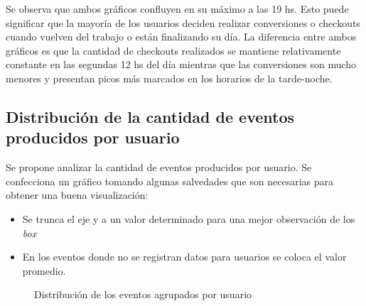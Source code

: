 \documentclass[a4paper]{article}
\begin{document}
Se observa que ambos gráficos confluyen en su máximo a las 19 hs. Esto puede significar que la mayoría de los usuarios deciden realizar conversiones o checkouts cuando vuelven del trabajo o están finalizando su día. La diferencia entre ambos gráficos es que la cantidad de checkouts realizados se mantiene relativamente constante en las segundas 12 hs del día mientras que las conversiones son mucho menores y presentan picos más marcados en los horarios de la tarde-noche. 

\subsection{Distribución de la cantidad de eventos producidos por usuario}

Se propone analizar la cantidad de eventos producidos por usuario. Se confecciona un gráfico tomando algunas salvedades que son necesarias para obtener una buena visualización:

\begin{itemize}
	\item Se trunca el eje y a un valor determinado para una mejor observación de los \textit{box}
	\item En los eventos donde no se registran datos para usuarios se coloca el valor promedio.
\end{itemize}


\begin{figure}[h!]
	\caption{Distribución de los eventos agrupados por usuario}
	\label{fig:boxplot}
\end{figure}
\end{document}
